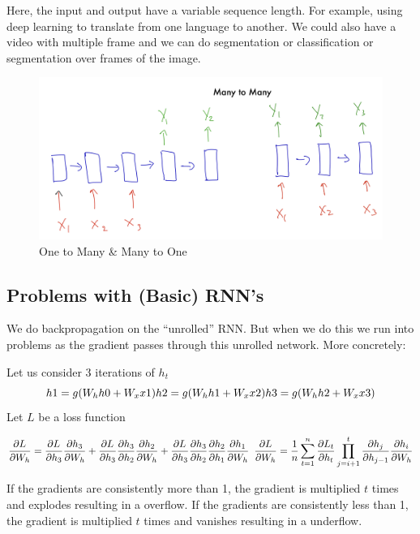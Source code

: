 \documentclass[
]{article}
\begin{document}
Here, the input and output have a variable sequence length. For example, using deep learning to translate from one language to another. We could also have a video with multiple frame and we can do segmentation or classification or segmentation over frames of the image.

\begin{figure}
\centering
\includegraphics{images/IMG_0013.jpg}
\caption{One to Many \& Many to One}
\end{figure}

\subsection{Problems with (Basic) RNN's}\label{problems-with-basic-rnns}

We do backpropagation on the ``unrolled'' RNN. But when we do this we run into problems as the gradient passes through this unrolled network. More concretely:

Let us consider 3 iterations of \(h_t\)
\[
h1 = g(W_hh0 + W_xx1) \\
h2 = g(W_hh1 + W_xx2) \\
h3 = g(W_hh2 + W_xx3) \\
\]
Let \(L\) be a loss function

\[
\frac{\partial L_{}}{\partial W_{h}} =
\frac{\partial L_{}}{\partial h_{3}} \frac{\partial h_{3}}{\partial W_{h}} +
\frac{\partial L_{}}{\partial h_{3}} \frac{\partial h_{3}}{\partial h_{2}} \frac{\partial h_{2}}{\partial W_{h}} +
\frac{\partial L_{}}{\partial h_{3}} \frac{\partial h_{3}}{\partial h_{2}} \frac{\partial h_{2}}{\partial h_{1}} \frac{\partial h_{1}}{\partial W_{h}}\\
\phantom{1}\\
\frac{\partial L}{\partial W_{h}} = \frac{1}{n} \sum_{t=1}^{n} \frac{\partial L_{t}}{\partial h_{t}} \prod_{j=i+1}^t \frac{\partial h_{j}}{\partial h_{j-1}} \frac{\partial h_{i}}{\partial W_{h}}
\]

If the gradients are consistently more than 1, the gradient is multiplied \(t\) times and explodes resulting in a overflow. If the gradients are consistently less than 1, the gradient is multiplied \(t\) times and vanishes resulting in a underflow.
\end{document}
